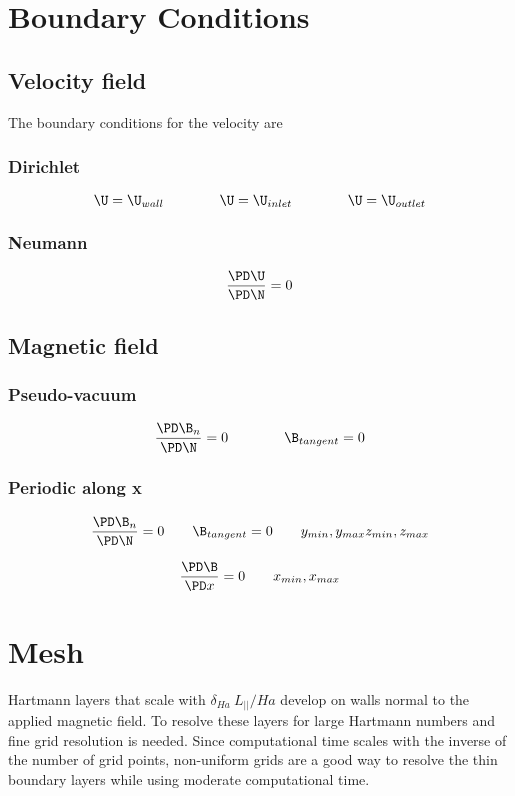 \documentclass[11pt]{article}
\begin{document}
\section{Boundary Conditions}

\subsection{Velocity field}
The boundary conditions for the velocity are

\subsubsection{Dirichlet}

\begin{equation}
	\U = \U_{wall}
	\qquad \qquad
	\U = \U_{inlet}
	\qquad \qquad
	\U = \U_{outlet}
\end{equation}

\subsubsection{Neumann}
\begin{equation}
	\frac{\PD \U}{\PD \N} = 0
\end{equation}

\subsection{Magnetic field}
\subsubsection{Pseudo-vacuum}
\begin{equation}
	\frac{\PD \B_{n}}{\PD \N} = 0
	\qquad \qquad
	\B_{tangent} = 0
\end{equation}

\subsubsection{Periodic along x}
\begin{equation}
	\frac{\PD \B_{n}}{\PD \N} = 0
	\qquad
	\B_{tangent} = 0
	\qquad
	y_{min},y_{max}
	z_{min},z_{max}
\end{equation}

\begin{equation}
	\frac{\PD \B}{\PD x} = 0
	\qquad
	x_{min},x_{max}
\end{equation}

\section{Mesh}
Hartmann layers that scale with $\delta_{Ha}~L_{||}/Ha$ develop on walls normal to the applied magnetic field. To resolve these layers for large Hartmann numbers and fine grid resolution is needed. Since computational time scales with the inverse of the number of grid points, non-uniform grids are a good way to resolve the thin boundary layers while using moderate computational time.
\end{document}
